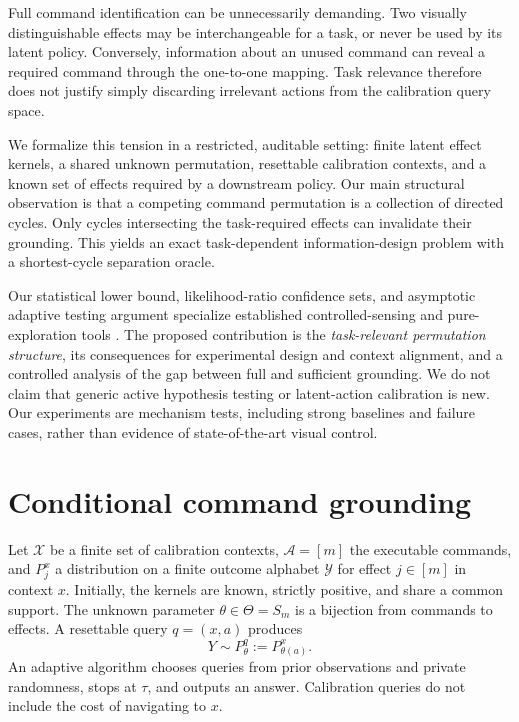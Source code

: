 \documentclass{article}
\begin{document}
Full command identification can be unnecessarily demanding. Two visually distinguishable effects may be interchangeable for a task, or never be used by its latent policy. Conversely, information about an unused command can reveal a required command through the one-to-one mapping. Task relevance therefore does not justify simply discarding irrelevant actions from the calibration query space.

We formalize this tension in a restricted, auditable setting: finite latent effect kernels, a shared unknown permutation, resettable calibration contexts, and a known set of effects required by a downstream policy. Our main structural observation is that a competing command permutation is a collection of directed cycles. Only cycles intersecting the task-required effects can invalidate their grounding. This yields an exact task-dependent information-design problem with a shortest-cycle separation oracle.

Our statistical lower bound, likelihood-ratio confidence sets, and asymptotic adaptive testing argument specialize established controlled-sensing and pure-exploration tools \citep{nitinawarat2012,kaufmann2016,garivier2016}. The proposed contribution is the \emph{task-relevant permutation structure}, its consequences for experimental design and context alignment, and a controlled analysis of the gap between full and sufficient grounding. We do not claim that generic active hypothesis testing or latent-action calibration is new. Our experiments are mechanism tests, including strong baselines and failure cases, rather than evidence of state-of-the-art visual control.

\section{Conditional command grounding}
Let $\mathcal X$ be a finite set of calibration contexts, $\mathcal A=[m]$ the executable commands, and $P_j^x$ a distribution on a finite outcome alphabet $\mathcal Y$ for effect $j\in[m]$ in context $x$. Initially, the kernels are known, strictly positive, and share a common support. The unknown parameter $\theta\in\Theta=S_m$ is a bijection from commands to effects. A resettable query $q=(x,a)$ produces
\begin{equation}
Y\sim P_\theta^q:=P_{\theta(a)}^x. \label{eq:model}
\end{equation}
An adaptive algorithm chooses queries from prior observations and private randomness, stops at $\tau$, and outputs an answer. Calibration queries do not include the cost of navigating to $x$.
\end{document}
